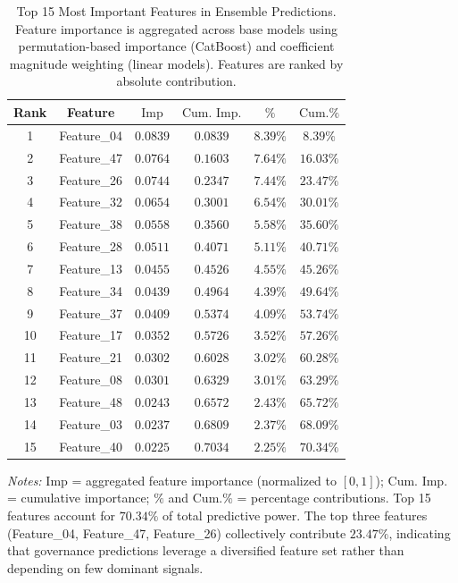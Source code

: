 \begin{table}[!htbp]
\centering
\caption{%
    Top 15 Most Important Features in Ensemble Predictions.
    Feature importance is aggregated across base models using permutation-based importance (CatBoost) 
    and coefficient magnitude weighting (linear models). Features are ranked by absolute contribution.
}
\label{tab:feature_importance}
\small
\begin{tabular}{cccccc}
\toprule
\textbf{Rank} & \textbf{Feature} & $\text{Imp}$ & $\text{Cum. Imp.}$ & $\%$ & $\text{Cum.}\%$ \\
\midrule
1  & Feature\_04  & $0.0839$ & $0.0839$ & $8.39\%$ & $8.39\%$ \\
2  & Feature\_47  & $0.0764$ & $0.1603$ & $7.64\%$ & $16.03\%$ \\
3  & Feature\_26  & $0.0744$ & $0.2347$ & $7.44\%$ & $23.47\%$ \\
4  & Feature\_32  & $0.0654$ & $0.3001$ & $6.54\%$ & $30.01\%$ \\
5  & Feature\_38  & $0.0558$ & $0.3560$ & $5.58\%$ & $35.60\%$ \\
6  & Feature\_28  & $0.0511$ & $0.4071$ & $5.11\%$ & $40.71\%$ \\
7  & Feature\_13  & $0.0455$ & $0.4526$ & $4.55\%$ & $45.26\%$ \\
8  & Feature\_34  & $0.0439$ & $0.4964$ & $4.39\%$ & $49.64\%$ \\
9  & Feature\_37  & $0.0409$ & $0.5374$ & $4.09\%$ & $53.74\%$ \\
10 & Feature\_17  & $0.0352$ & $0.5726$ & $3.52\%$ & $57.26\%$ \\
11 & Feature\_21  & $0.0302$ & $0.6028$ & $3.02\%$ & $60.28\%$ \\
12 & Feature\_08  & $0.0301$ & $0.6329$ & $3.01\%$ & $63.29\%$ \\
13 & Feature\_48  & $0.0243$ & $0.6572$ & $2.43\%$ & $65.72\%$ \\
14 & Feature\_03  & $0.0237$ & $0.6809$ & $2.37\%$ & $68.09\%$ \\
15 & Feature\_40  & $0.0225$ & $0.7034$ & $2.25\%$ & $70.34\%$ \\
\bottomrule
\end{tabular}
\begin{flushleft}
\footnotesize
\textit{Notes:} 
$\text{Imp}$ = aggregated feature importance (normalized to $[0, 1]$);
$\text{Cum. Imp.}$ = cumulative importance;
$\%$ and $\text{Cum.}\%$ = percentage contributions.
Top 15 features account for $70.34\%$ of total predictive power.
The top three features (Feature\_04, Feature\_47, Feature\_26) collectively contribute $23.47\%$,
indicating that governance predictions leverage a diversified feature set rather than depending on few dominant signals.
\end{flushleft}
\end{table}

